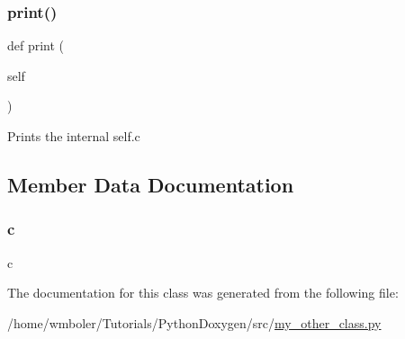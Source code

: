 \subsubsection{\texorpdfstring{print()}{print()}}
{\footnotesize\ttfamily def print (\begin{DoxyParamCaption}\item[{}]{self }\end{DoxyParamCaption})}

\begin{DoxyVerb}Prints the internal self.c
\end{DoxyVerb}
 

\subsection{Member Data Documentation}
\mbox{\label{classsrc_1_1my__other__class_1_1MyOtherClass_ae0323a9039add2978bf5b49550572c7c}} 
\subsubsection{\texorpdfstring{c}{c}}
{\footnotesize\ttfamily c}



The documentation for this class was generated from the following file\+:\begin{DoxyCompactItemize}
\item 
/home/wmboler/\+Tutorials/\+Python\+Doxygen/src/\hyperlink{my__other__class_8py}{my\+\_\+other\+\_\+class.\+py}\end{DoxyCompactItemize}
